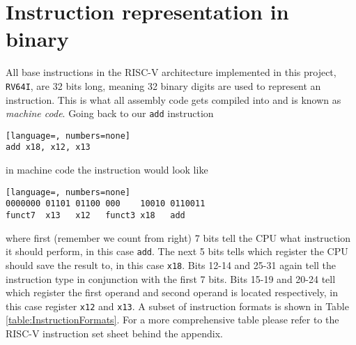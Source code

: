 \section{Instruction representation in binary}\label{section:InstructionRep}
    All base instructions in the RISC-V architecture implemented in this project, \texttt{RV64I}, are 32 bits long, meaning 32 binary digits are used to represent an instruction. This is what all assembly code gets compiled into and is known as \textit{machine code}.
    Going back to our \texttt{add} instruction 
    \begin{lstlisting}[language=, numbers=none]
add x18, x12, x13
    \end{lstlisting}
    in machine code the instruction would look like
    \begin{lstlisting}[language=, numbers=none]
0000000 01101 01100 000    10010 0110011
funct7  x13   x12   funct3 x18   add
    \end{lstlisting}
    where first (remember we count from right) 7 bits tell the CPU what instruction it should perform, in this case \texttt{add}. The next 5 bits tells which register the CPU should save the result to, in this case \texttt{x18}. Bits 12-14 and 25-31 again tell the instruction type in conjunction with the first 7 bits. Bits 15-19 and 20-24 tell which register the first operand and second operand is located respectively, in this case register \texttt{x12} and \texttt{x13}. A subset of instruction formats is shown in Table \ref{table:InstructionFormats}. For a more comprehensive table please refer to the RISC-V instruction set sheet behind the appendix.
    
